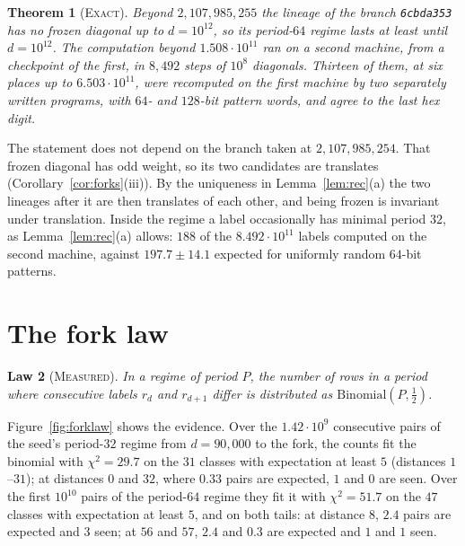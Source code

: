 \documentclass[11pt]{article}
\newtheorem{theorem}{Theorem}[section]
\newtheorem{law}[theorem]{Law}
\theoremstyle{definition}
\theoremstyle{remark}
\newcommand{\EXACT}{\textsc{Exact}}
\newcommand{\MEASURED}{\textsc{Measured}}
\begin{document}
\begin{theorem}[\EXACT]\label{thm:frontier}
Beyond $2{,}107{,}985{,}255$ the lineage of the branch \texttt{6cbda353} has no frozen diagonal up to $d=10^{12}$, so its period-$64$ regime lasts at least until $d=10^{12}$. The computation beyond $1.508\cdot10^{11}$ ran on a second machine, from a checkpoint of the first, in $8{,}492$ steps of $10^8$ diagonals. Thirteen of them, at six places up to $6.503\cdot10^{11}$, were recomputed on the first machine by two separately written programs, with $64$- and $128$-bit pattern words, and agree to the last hex digit.
\end{theorem}

The statement does not depend on the branch taken at $2{,}107{,}985{,}254$. That frozen diagonal has odd weight, so its two candidates are translates (Corollary~\ref{cor:forks}(iii)). By the uniqueness in Lemma~\ref{lem:rec}(a) the two lineages after it are then translates of each other, and being frozen is invariant under translation. Inside the regime a label occasionally has minimal period $32$, as Lemma~\ref{lem:rec}(a) allows: $188$ of the $8.492\cdot10^{11}$ labels computed on the second machine, against $197.7\pm14.1$ expected for uniformly random $64$-bit patterns.

\section{The fork law}

\begin{law}[\MEASURED]\label{law:fork}
In a regime of period $P$, the number of rows in a period where consecutive labels $r_d$ and $r_{d+1}$ differ is distributed as $\mathrm{Binomial}(P,\tfrac12)$.
\end{law}

Figure~\ref{fig:forklaw} shows the evidence. Over the $1.42\cdot10^9$ consecutive pairs of the seed's period-$32$ regime from $d=90{,}000$ to the fork, the counts fit the binomial with $\chi^2=29.7$ on the $31$ classes with expectation at least $5$ (distances $1$--$31$); at distances $0$ and $32$, where $0.33$ pairs are expected, $1$ and $0$ are seen. Over the first $10^{10}$ pairs of the period-$64$ regime they fit it with $\chi^2=51.7$ on the $47$ classes with expectation at least $5$, and on both tails: at distance $8$, $2.4$ pairs are expected and $3$ seen; at $56$ and $57$, $2.4$ and $0.3$ are expected and $1$ and $1$ seen.
\end{document}
